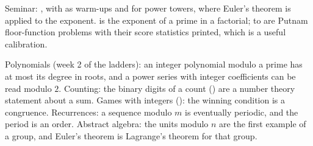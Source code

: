 Seminar: , with  as warm-ups and  for power towers, where Euler's theorem is applied to the exponent.  is the exponent of a prime in a factorial;  to  are Putnam floor-function problems with their score statistics printed, which is a useful calibration.

\begin{hides}
Polynomials (week 2 of the ladders): an integer polynomial modulo a prime has at most its degree in roots, and a power series with integer coefficients can be read modulo $2$. Counting: the binary digits of a count () are a number theory statement about a sum. Games with integers (): the winning condition is a congruence. Recurrences: a sequence modulo $m$ is eventually periodic, and the period is an order. Abstract algebra: the units modulo $n$ are the first example of a group, and Euler's theorem is Lagrange's theorem for that group.
\end{hides}
